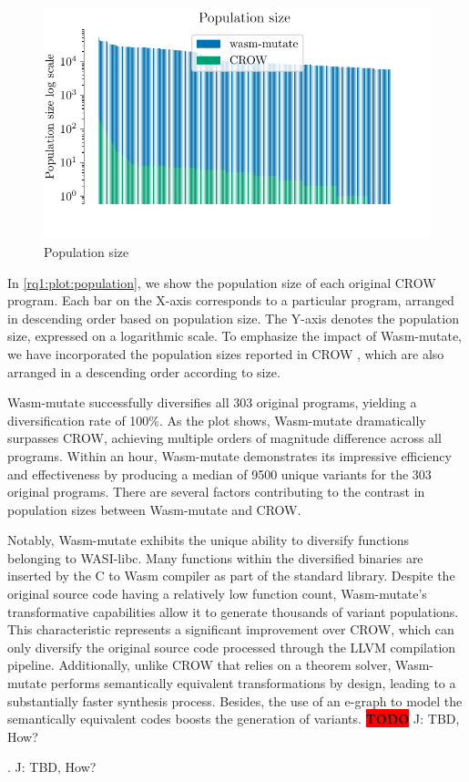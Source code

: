 \documentclass[sigplan,screen]{acmart}
\newcommand*\badge[1]{ \colorbox{red}{\color{white}#1}}
\newcommand{\tool}{Wasm-mutate\xspace}
\newcommand{\wasm}{Wasm\xspace}
\newcommand{\todo}[1]{%
\refstepcounter{todo}
\noindent\textbf{\badge{TODO}} {\color{red}#1}
\addcontentsline{td}{todo}
{\color{red}\thesection.\thetodo\xspace #1}}
\begin{document}
\begin{figure}
    \centering
    \includegraphics[width=\linewidth]{plots/rq1/population.pdf}
    \caption{Population size}
  \label{rq1:plot:population}
\end{figure}


In \autoref{rq1:plot:population}, we show the population size of each original CROW program. 
Each bar on the X-axis corresponds to a particular program, arranged in descending order based on population size. 
The Y-axis denotes the population size, expressed on a logarithmic scale. 
To emphasize the impact of \tool, we have incorporated the population sizes reported in CROW \cite{arteaga2020crow}, which are also arranged in a descending order according to size.

\tool successfully diversifies all 303 original programs, yielding a diversification rate of 100\%. As the plot shows, \tool dramatically surpasses CROW, achieving multiple orders of magnitude difference across all programs.
Within an hour, \tool demonstrates its impressive efficiency and effectiveness by producing a median of 9500 unique variants for the 303 original programs.
There are several factors contributing to the contrast in population sizes between \tool and CROW. 

Notably, \tool exhibits the unique ability to diversify functions belonging to WASI-libc. 
Many functions within the diversified binaries are inserted by the C to \wasm compiler as part of the standard library. 
Despite the original source code having a relatively low function count, \tool's transformative capabilities allow it to generate thousands of variant populations.
This characteristic represents a significant improvement over CROW, which can only diversify the original source code processed through the LLVM compilation pipeline. 
Additionally, unlike CROW that relies on a theorem solver, \tool performs semantically equivalent transformations by design, leading to a substantially faster synthesis process.
Besides, the use of an e-graph to model the semantically equivalent codes boosts the generation of variants. \todo{J: TBD, How?}
\end{document}
